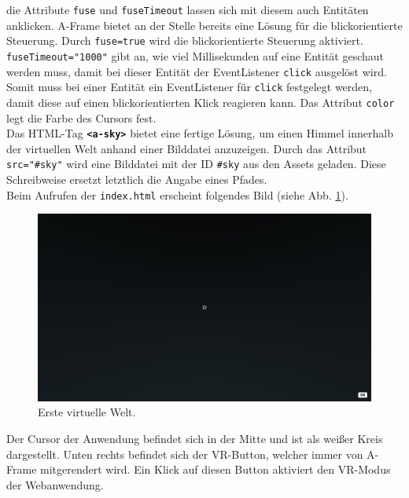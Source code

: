 \documentclass[a4paper,12pt,oneside]{article}
\begin{document}
        die Attribute \texttt{fuse} und \texttt{fuseTimeout} lassen sich mit
        diesem auch Entitäten anklicken. A-Frame bietet an der Stelle bereits
        eine Lösung für die blickorientierte Steuerung. Durch 
        \texttt{fuse=true} wird die blickorientierte Steuerung aktiviert.
        \texttt{fuseTimeout="1000"} gibt an, wie viel Millisekunden 
        auf eine Entität geschaut werden muss, 
        damit bei dieser Entität der EventListener
        \texttt{click} ausgelöst wird. Somit muss bei einer Entität ein
        EventListener für \texttt{click} festgelegt werden, damit diese auf
        einen blickorientierten Klick reagieren kann. Das Attribut 
        \texttt{color} legt die Farbe des Cursors fest. \\
        Das HTML-Tag \texttt{\textbf{<a-sky>}} bietet eine fertige Lösung,
        um einen Himmel innerhalb der virtuellen Welt anhand einer Bilddatei
        anzuzeigen. Durch das Attribut \texttt{src="\#sky"} wird eine
        Bilddatei mit der ID \texttt{\#sky} aus den Assets geladen. Diese
        Schreibweise ersetzt letztlich die Angabe eines Pfades. \\
        Beim Aufrufen der \texttt{index.html} erscheint folgendes Bild
        (siehe Abb. \ref{fig:vr-welt1}).
        \begin{figure}[h]
          \centering
          \includegraphics[scale=0.3]{img/coding/vr-welt1.png}
          \caption{Erste virtuelle Welt.}
          \label{fig:vr-welt1}
        \end{figure}
        Der Cursor der Anwendung befindet sich in der Mitte und ist als weißer
        Kreis dargestellt. Unten rechts befindet sich der VR-Button, welcher
        immer von A-Frame mitgerendert wird. Ein Klick auf diesen Button 
        aktiviert den VR-Modus der Webanwendung. \\
\end{document}
